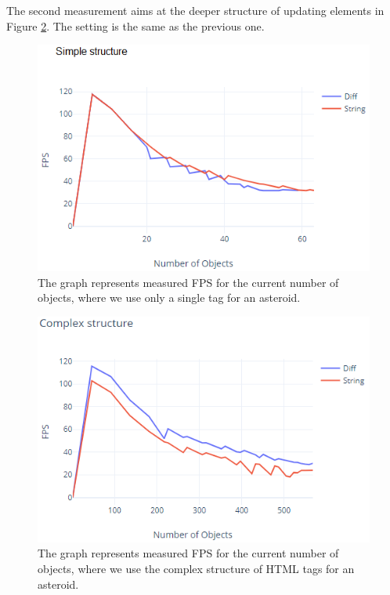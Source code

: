 The second measurement aims at the deeper structure of updating elements in Figure \ref{img32:benchmark2}.
The setting is the same as the previous one.
\par
\begin{figure}\centering
\includegraphics{./img/graph_1}
\caption{The graph represents measured FPS for the current number of objects, where we use only a single tag for an asteroid.}
\label{img31:benchmark1}
\end{figure} 
\par
\begin{figure}\centering
\includegraphics{./img/graph_3}
\caption{The graph represents measured FPS for the current number of objects, where we use the complex structure of HTML tags for an asteroid.}
\label{img32:benchmark2}
\end{figure} 
\par
